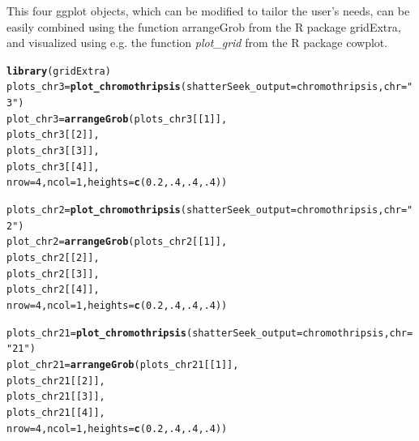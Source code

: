 \documentclass[twoside,a4wide,11pt]{article}\usepackage[]{graphicx}\usepackage[]{color}
\makeatletter
\newcommand{\hlnum}[1]{\textcolor[rgb]{0.686,0.059,0.569}{#1}}%
\newcommand{\hlstr}[1]{\textcolor[rgb]{0.192,0.494,0.8}{#1}}%
\newcommand{\hlstd}[1]{\textcolor[rgb]{0.345,0.345,0.345}{#1}}%
\newcommand{\hlkwb}[1]{\textcolor[rgb]{0.69,0.353,0.396}{#1}}%
\newcommand{\hlkwc}[1]{\textcolor[rgb]{0.333,0.667,0.333}{#1}}%
\newcommand{\hlkwd}[1]{\textcolor[rgb]{0.737,0.353,0.396}{\textbf{#1}}}%
\newenvironment{kframe}{%
 \def\at@end@of@kframe{}%
 \ifinner\ifhmode%
  \def\at@end@of@kframe{\end{minipage}}%
  \begin{minipage}{\columnwidth}%
 \fi\fi%
 \def\FrameCommand##1{\hskip\@totalleftmargin \hskip-\fboxsep
 \colorbox{shadecolor}{##1}\hskip-\fboxsep
     \hskip-\linewidth \hskip-\@totalleftmargin \hskip\columnwidth}%
 \MakeFramed {\advance\hsize-\width
   \@totalleftmargin\z@ \linewidth\hsize
   \@setminipage}}%
 {\par\unskip\endMakeFramed%
 \at@end@of@kframe}
\newenvironment{knitrout}{}{} %
\makeatother
\begin{document}
This four ggplot objects, which can be modified to tailor the user's needs, 
can be easily combined using the function arrangeGrob from the R package gridExtra,
and visualized using e.g. the function {\it plot\_grid} from the R package cowplot.

\begin{knitrout}
\color{fgcolor}\begin{kframe}
\begin{alltt}
\hlkwd{library}\hlstd{(gridExtra)}
\hlstd{plots_chr3} \hlkwb{=} \hlkwd{plot_chromothripsis}\hlstd{(}\hlkwc{shatterSeek_output} \hlstd{= chromothripsis,}\hlkwc{chr} \hlstd{=} \hlstr{"3"}\hlstd{)}
\hlstd{plot_chr3} \hlkwb{=} \hlkwd{arrangeGrob}\hlstd{(plots_chr3[[}\hlnum{1}\hlstd{]],}
                        \hlstd{plots_chr3[[}\hlnum{2}\hlstd{]],}
                        \hlstd{plots_chr3[[}\hlnum{3}\hlstd{]],}
                        \hlstd{plots_chr3[[}\hlnum{4}\hlstd{]],}
                        \hlkwc{nrow}\hlstd{=}\hlnum{4}\hlstd{,}\hlkwc{ncol}\hlstd{=}\hlnum{1}\hlstd{,}\hlkwc{heights}\hlstd{=}\hlkwd{c}\hlstd{(}\hlnum{0.2}\hlstd{,}\hlnum{.4}\hlstd{,}\hlnum{.4}\hlstd{,}\hlnum{.4}\hlstd{))}

\hlstd{plots_chr2} \hlkwb{=} \hlkwd{plot_chromothripsis}\hlstd{(}\hlkwc{shatterSeek_output} \hlstd{= chromothripsis,}\hlkwc{chr} \hlstd{=} \hlstr{"2"}\hlstd{)}
\hlstd{plot_chr2} \hlkwb{=} \hlkwd{arrangeGrob}\hlstd{(plots_chr2[[}\hlnum{1}\hlstd{]],}
                        \hlstd{plots_chr2[[}\hlnum{2}\hlstd{]],}
                        \hlstd{plots_chr2[[}\hlnum{3}\hlstd{]],}
                        \hlstd{plots_chr2[[}\hlnum{4}\hlstd{]],}
                         \hlkwc{nrow}\hlstd{=}\hlnum{4}\hlstd{,}\hlkwc{ncol}\hlstd{=}\hlnum{1}\hlstd{,}\hlkwc{heights}\hlstd{=}\hlkwd{c}\hlstd{(}\hlnum{0.2}\hlstd{,}\hlnum{.4}\hlstd{,}\hlnum{.4}\hlstd{,}\hlnum{.4}\hlstd{))}

\hlstd{plots_chr21} \hlkwb{=} \hlkwd{plot_chromothripsis}\hlstd{(}\hlkwc{shatterSeek_output} \hlstd{= chromothripsis,}\hlkwc{chr} \hlstd{=} \hlstr{"21"}\hlstd{)}
\hlstd{plot_chr21} \hlkwb{=} \hlkwd{arrangeGrob}\hlstd{(plots_chr21[[}\hlnum{1}\hlstd{]],}
                         \hlstd{plots_chr21[[}\hlnum{2}\hlstd{]],}
                         \hlstd{plots_chr21[[}\hlnum{3}\hlstd{]],}
                         \hlstd{plots_chr21[[}\hlnum{4}\hlstd{]],}
                         \hlkwc{nrow}\hlstd{=}\hlnum{4}\hlstd{,}\hlkwc{ncol}\hlstd{=}\hlnum{1}\hlstd{,}\hlkwc{heights}\hlstd{=}\hlkwd{c}\hlstd{(}\hlnum{0.2}\hlstd{,}\hlnum{.4}\hlstd{,}\hlnum{.4}\hlstd{,}\hlnum{.4}\hlstd{))}


\end{alltt}
\end{kframe}
\end{knitrout}
\end{document}
